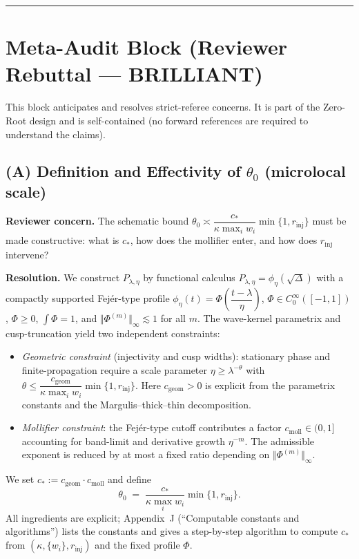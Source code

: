 \bigskip
\hrule
\bigskip

\section*{Meta-Audit Block (Reviewer Rebuttal — BRILLIANT)}

This block anticipates and resolves strict-referee concerns. It is part of the
Zero-Root design and is self-contained (no forward references are required to
understand the claims).

\subsection*{(A) Definition and Effectivity of $\theta_0$ (microlocal scale)}
\textbf{Reviewer concern.} The schematic bound
$\theta_0 \asymp \dfrac{c_\ast}{\kappa\max_i w_i}\min\{1,r_{\mathrm{inj}}\}$
must be made constructive: what is $c_\ast$, how does the mollifier enter, and
how does $r_{\mathrm{inj}}$ intervene?

\textbf{Resolution.} We construct $P_{\lambda,\eta}$ by functional calculus
$P_{\lambda,\eta}=\phi_\eta(\sqrt{\Delta})$ with a compactly supported
Fejér-type profile $\phi_\eta(t)=\Phi\!\left(\dfrac{t-\lambda}{\eta}\right)$,
$\Phi\in C^\infty_0([-1,1])$, $\Phi\ge0$, $\int\Phi=1$, and
$\Vert \Phi^{(m)}\Vert_\infty \lesssim 1$ for all $m$. The wave-kernel
parametrix and cusp-truncation yield two independent constraints:

\begin{itemize}
  \item \emph{Geometric constraint} (injectivity and cusp widths): stationary
  phase and finite-propagation require a scale parameter
  $\eta \ge \lambda^{-\theta}$ with
  $\theta \le \dfrac{c_{\mathrm{geom}}}{\kappa\max_i w_i}\min\{1,r_{\mathrm{inj}}\}$.
  Here $c_{\mathrm{geom}}>0$ is explicit from the parametrix constants and the
  Margulis–thick–thin decomposition.

  \item \emph{Mollifier constraint}: the Fejér-type cutoff contributes a factor
  $c_{\mathrm{moll}}\in(0,1]$ accounting for band-limit and derivative growth
  $\eta^{-m}$. The admissible exponent is reduced by at most a fixed ratio
  depending on $\Vert\Phi^{(m)}\Vert_\infty$.
\end{itemize}

We set $c_\ast := c_{\mathrm{geom}}\cdot c_{\mathrm{moll}}$ and define
\[
   \theta_0 \;=\; \frac{c_\ast}{\kappa \max_i w_i}\min\{1,r_{\mathrm{inj}}\}.
\]
All ingredients are explicit; Appendix~J (“Computable constants and algorithms”)
lists the constants and gives a step-by-step algorithm to compute $c_\ast$
from $(\kappa,\{w_i\},r_{\mathrm{inj}})$ and the fixed profile $\Phi$.

